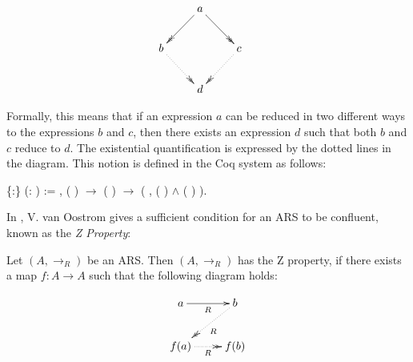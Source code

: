     $\centerline{\xymatrix{ & a \ar@{->>}[dl] \ar@{->>}[dr] & \\ b
    \ar@{.>>}[dr] & & c \ar@{.>>}[dl] \\ & d & }}$


    Formally, this means that if an expression $a$ can be reduced in
    two different ways to the expressions $b$ and $c$, then there
    exists an expression $d$ such that both $b$ and $c$ reduce to
    $d$. The existential quantification is expressed by the dotted
    lines in the diagram. This notion is defined in the Coq system as
    follows: \begin{coqdoccode}
\coqdocemptyline
\coqdocnoindent
{}  \{:\} (:  ) := \coqdockw{\ensuremath{\forall}}   , ( )   \ensuremath{\rightarrow} ( )   \ensuremath{\rightarrow} (\coqdoctac{\ensuremath{\exists}} , ( )   \ensuremath{\land} ( )  ).\coqdoceol
\coqdocemptyline
\end{coqdoccode}
In \cite{dehornoy2008z}, V. van Oostrom gives a sufficient
    condition for an ARS to be confluent, known as the \textit{Z Property}:


    \begin{definition} Let $(A,\to_R)$ be an ARS. Then $(A,\to_R)$
      has the Z property, if there exists a map $f:A \to A$ such that
      the following diagram holds:
    
      \[ \xymatrix{ a \ar[r]_R & b \ar@{.>>}[dl]^R\\ f(a)
      \ar@{.>>}[r]_R & f(b) \\ } \] \end{definition}


